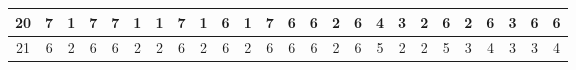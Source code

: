 \begin{sidewaystable}[]
\begin{tabular}{|c|c|c|c|c|c|c|c|c|c|c|c|c|c|c|c|c|c|c|c|c|c|c|c|c|}
    20      & 7                                               & 1                                               & 7                                               & 7                                               & 1                                               & 1                                               & 7                                               & 1                                               & 6                                               & 1                                                & 7                                                & 6                                                 &    6                                               & 2                                               & 6                                               & 4                                               & 3                                               & 2                                               & 6                                               & 2                                               & 6                                               & 3                                                & 6                                                & 6                                                \\ \hline
    21      & 6                                               & 2                                               & 6                                               & 6                                               & 2                                               & 2                                               & 6                                               & 2                                               & 6                                               & 2                                                & 6                                                & 6                                                 &    6                                               & 2                                               & 6                                               & 5                                               & 2                                               & 2                                               & 5                                               & 3                                               & 4                                               & 3                                                & 3                                                & 4                                                \\ \hline

\end{tabular}
\end{sidewaystable}
